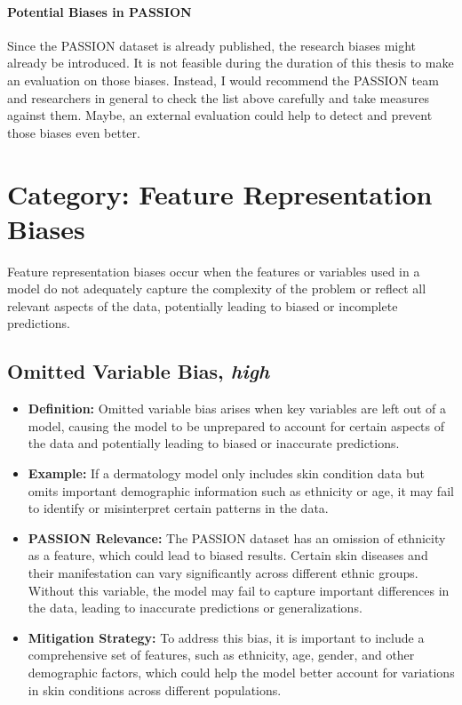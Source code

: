 \begin{refsection}
		\paragraph{Potential Biases in PASSION}
		Since the PASSION dataset is already published, the research biases might already be introduced. It is not feasible during the duration of this thesis to make an evaluation on those biases. Instead, I would recommend the PASSION team and researchers in general to check the list above carefully and take measures against them. Maybe, an external evaluation could help to detect and prevent those biases even better.
		
		
		\section{\textbf{Category:} Feature Representation Biases}
		Feature representation biases occur when the features or variables used in a model do not adequately capture the complexity of the problem or reflect all relevant aspects of the data, potentially leading to biased or incomplete predictions.
		
		\subsection{Omitted Variable Bias, \textit{high}}
		\begin{itemize}
			\item \textbf{Definition:} Omitted variable bias arises when key variables are left out of a model, causing the model to be unprepared to account for certain aspects of the data and potentially leading to biased or inaccurate predictions.
			\item \textbf{Example:} If a dermatology model only includes skin condition data but omits important demographic information such as ethnicity or age, it may fail to identify or misinterpret certain patterns in the data.
			\item \textbf{PASSION Relevance:} The PASSION dataset has an omission of ethnicity as a feature, which could lead to biased results. Certain skin diseases and their manifestation can vary significantly across different ethnic groups. Without this variable, the model may fail to capture important differences in the data, leading to inaccurate predictions or generalizations.
			\item \textbf{Mitigation Strategy:} To address this bias, it is important to include a comprehensive set of features, such as ethnicity, age, gender, and other demographic factors, which could help the model better account for variations in skin conditions across different populations.
		\end{itemize}
		

\end{refsection}

